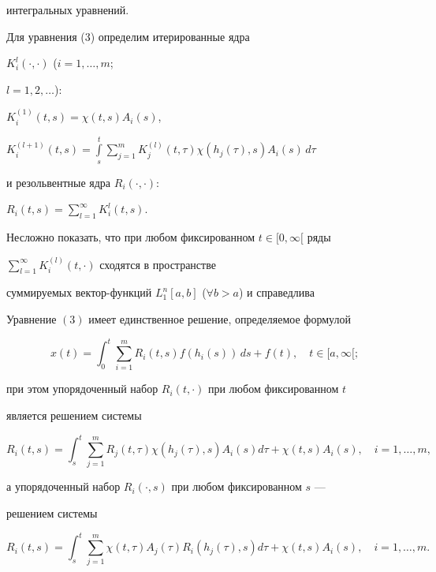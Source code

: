 интегральных уравнений.





Для уравнения (3) определим итерированные ядра


$K_i^l(\cdot,\cdot)$ ($i=1,\dotsc, m$;


$l=1,2,\dotsc$):


$K_i^{(1)}(t,s) =\chi(t,s)A_i(s)$,


$K_i^{(l+1)}(t,s)=\int\limits_s^t\sum\limits_{j=1}^m K_j^{(l)}(t,\tau)


\chi(h_j(\tau),s)A_i(s)\,d\tau$


и резольвентные ядра $R_i(\cdot,\cdot)$:


$R_i(t,s)=\sum\limits_{l=1}^\infty K_i^ l(t,s)$.


Несложно показать, что при любом фиксированном $t\in [0,\infty[$ ряды


$\sum\limits_{l=1}^\infty K_i^ {(l)}(t,\cdot)$  сходятся в пространстве 


суммируемых вектор-функций $L_1^n[a,b]$ ($\forall b>a$) и справедлива





\begin{thm}


Уравнение $(3)$ имеет единственное решение, определяемое формулой


\begin{equation}


x (t)=\int_0^t\sum_{i=1}^mR_i (t,s)f(h_i(s))\,ds+f(t),


\quad  t\in [a,\infty[;


\end{equation}


при этом  упорядоченный набор $R_i(t,\cdot)$ при любом фиксированном $t$


является решением системы


\begin{equation}


R_i(t,s)=\int_s^t\sum_{j=1}^m R_j(t,\tau)


\chi(h_j(\tau),s)A_i(s)d\tau+\chi(t,s)A_i(s),\quad i=1,\dotsc,m,


\end{equation}


а упорядоченный набор $R_i(\cdot,s)$ при любом фиксированном $s$ ---


решением системы


\begin{equation}


R_i(t,s)=\int_s^t\sum_{j=1}^m \chi(t,\tau)A_j(\tau)


R_i(h_j(\tau),s)d\tau+\chi(t,s)A_i(s),\quad i=1,\dotsc,m.


\end{equation}


\end{thm}





